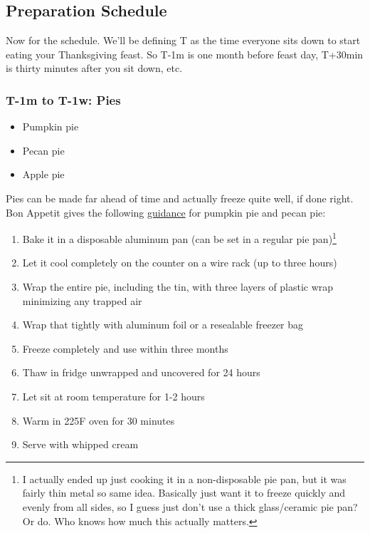 \documentclass[12pt]{article}
\begin{document}
	\subsection{Preparation Schedule}\label{sec:prep_schedule}
	Now for the schedule. We'll be defining T as the time everyone sits down to start eating your Thanksgiving feast. So T-1m is one month before feast day, T+30min is thirty minutes after you sit down, etc.
	
	\subsubsection{T-1m to T-1w: Pies}
	\begin{itemize}
		\item Pumpkin pie
		\item Pecan pie
		\item Apple pie
	\end{itemize}
	
	Pies can be made far ahead of time and actually freeze quite well, if done right. Bon Appetit gives the following \href{https://www.bonappetit.com/story/can-you-freeze-pumpkin-pie}{guidance} for pumpkin pie and pecan pie:
	\begin{enumerate}
		\item Bake it in a disposable aluminum pan (can be set in a regular pie pan)\footnote{I actually ended up just cooking it in a non-disposable pie pan, but it was fairly thin metal so same idea. Basically just want it to freeze quickly and evenly from all sides, so I guess just don't use a thick glass/ceramic pie pan? Or do. Who knows how much this actually matters.}
		\item Let it cool completely on the counter on a wire rack (up to three hours)
		\item Wrap the entire pie, including the tin, with three layers of plastic wrap minimizing any trapped air
		\item Wrap that tightly with aluminum foil or a resealable freezer bag
		\item Freeze completely and use within three months
		\item Thaw in fridge unwrapped and uncovered for 24 hours
		\item Let sit at room temperature for 1-2 hours
		\item Warm in 225F oven for 30 minutes
		\item Serve with whipped cream
	\end{enumerate}
	
\end{document}
